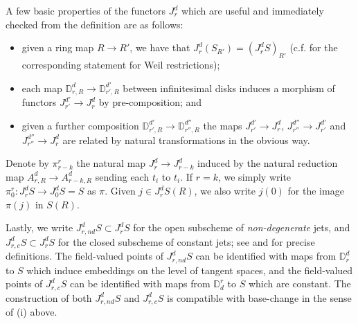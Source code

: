 \documentclass[letter, 11pt]{article}
\theoremstyle{plain}
\theoremstyle{definition}
\newcommand{\ID}{\mathbb{D}}
\newcommand{\<}{\langle}
\renewcommand{\>}{\rangle}
\begin{document}
 A few basic properties of the functors $J^{d}_{r}$ which are useful and immediately checked from the definition are as follows:
 \begin{itemize}
     \item[(i)] given a ring map $R \to R'$, we have that $J^{d}_{r} (S_{R'}) = (J^{d}_{r} S)_{R'}$ (c.f. \cite[Prop 6.2.2(2)]{zbMATH07565706} for the corresponding statement for Weil restrictions); 
     \item[(ii)] each map $\mathbb{D}^{d}_{r, R} \to \mathbb{D}^{d'}_{r',R}$ between infinitesimal disks induces a morphism of functors $J^{d'}_{r'} \to J^{d}_{r}$ by pre-composition; and
     \item[(iii)] given a further composition $\mathbb{D}^{d'}_{r',R} \to \mathbb{D}^{d''}_{r'',R}$ the maps $J^{d'}_{r'} \to J^{d}_{r}$, $J^{d''}_{r''} \to J^{d'}_{r'}$ and $J^{d''}_{r''} \to J^{d}_{r}$ are related by natural transformations in the obvious way.
 \end{itemize}

Denote by $\pi^r_{r - k}$ the natural map $J^{d}_{r} \to J^{d}_{r-k}$ induced by the natural reduction map $A^d_{r, R} \to A^d_{r -k , R}$ sending each $t_i$ to $t_i$. If $r = k$, we simply write $\pi^r_0 : J^d_r S \to J^d_0 S = S$ as $\pi$. Given $j \in J^d_r S(R)$, we also write $j(0)$ for the image $\pi(j)$ in $S(R)$. 


Lastly, we write $J^{d}_{r,nd} S \subset J^{d}_{r} S$ for the open subscheme of \emph{non-degenerate} jets, and $J^{d}_{r,c} S \subset J^{d}_{r} S$ for the closed subscheme of constant jets; see \cite[Def. 3.4]{urbanik2022algebraic} and \cite[\S3]{urbanik2022algebraic} for precise definitions. The field-valued points of $J^{d}_{r,nd} S$ can be identified with maps from $\ID^{d}_{r}$ to $S$ which induce embeddings on the level of tangent spaces, and the field-valued points of $J^{d}_{r,c} S$ can be identified with maps from $\ID^{r}_{d}$ to $S$ which are constant. The construction of both $J^{d}_{r,nd} S$ and $J^{d}_{r,c} S$ is compatible with base-change in the sense of (i) above.
\end{document}

